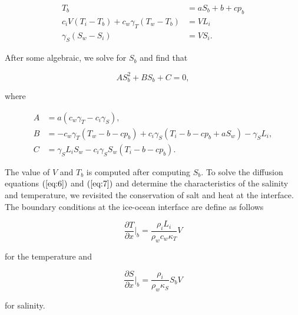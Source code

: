 \documentclass[11pt,a4paper]{article}
\begin{document}
		\begin{align}
			T_b & = a S_b + b + cp_b\\
			c_iV\left(T_i-T_b\right) + c_w\gamma_T(T_w-T_b)& = VL_i\\
			\gamma_S(S_w-S_i) & = VS_i.
		\end{align}
	
		After some algebraic, we solve for $S_b$ and find that
		
		\begin{equation}
			AS_b^2 + BS_b + C = 0,
		\end{equation}
		
		where
		
	\begin{align*}
		A &= a(c_w\gamma_T-c_i\gamma_S),\\
		B &= -c_w\gamma_T(T_w-b-cp_b) + c_i\gamma_S(T_i-b-cp_b+aS_w)-\gamma_SL_i,\\
		C &= \gamma_SL_iS_w-c_i\gamma_SS_w(T_i-b-cp_b).
	\end{align*}
		
	The value of $V$ and $T_b$ is computed after computing $S_b$. To solve the diffusion equations $(\ref{eq:6})$ and $(\ref{eq:7})$ and determine the characteristics of the salinity and temperature, we revisited the conservation of salt and heat at the interface. The boundary conditions at the ice-ocean interface are define as follows 
	
	\begin{equation}
		\label{eq:eq10}
		\dfrac{\partial T}{\partial x}\bigg|_b = \dfrac{\rho_iL_i}{\rho_wc_w\kappa_T}V
	\end{equation}
	
	\noindent for the temperature and 
	
	\begin{equation}
		\label{eq:eq11}
		\dfrac{\partial S}{\partial x}\bigg|_b = \dfrac{\rho_i}{\rho_w\kappa_S}S_bV
	\end{equation}
	
	\noindent for salinity.
	
\end{document}
